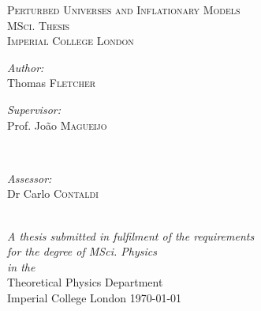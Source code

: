 \documentclass[12pt]{article} %
\begin{document}

\begin{titlepage}

\newcommand{\HRule}{\rule{\linewidth}{0.5mm}} %

\center %


\textsc{\LARGE Perturbed Universes and Inflationary Models}\\[0.5cm] %
\textsc{\Large MSci. Thesis}\\[0.5cm] %

\textsc{\large Imperial College London}\\[1.5cm] %

\begin{center}
\large \emph{Author:}\\
Thomas \textsc{Fletcher} %
\end{center}

\vspace{2cm}

\begin{minipage}{0.4\textwidth}
\begin{flushleft} \large
\emph{Supervisor:}\\
Prof. Jo\~{a}o \textsc{Magueijo} %
\end{flushleft}
\end{minipage}
~
\begin{minipage}{0.4\textwidth}
\begin{flushright} \large
\emph{Assessor:} \\
Dr Carlo  \textsc{Contaldi} %
\end{flushright}
\end{minipage}\\[3cm]


\large \textit{A thesis submitted in fulfilment of the requirements\\ for the degree of MSci. Physics}\\[0.3cm] %
\textit{in the}\\[0.4cm]
Theoretical Physics Department
\\ Imperial College London
\vfill %
{\large \today}\\[3cm] %




\end{titlepage}
\end{document}
